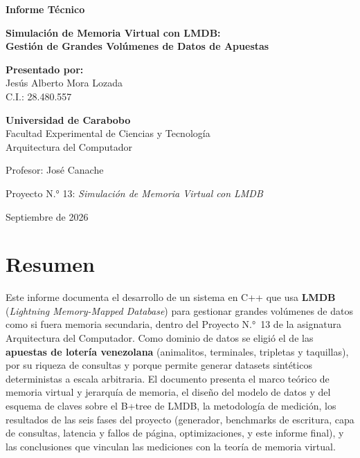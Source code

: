 \documentclass[12pt, letterpaper]{article}
\newcommand{\authorname}{Jesús Alberto Mora Lozada}
\newcommand{\institucion}{Universidad de Carabobo}
\newcommand{\profesorname}{José Canache}
\begin{document}
\begin{titlepage}
    \centering
    \vspace*{1cm}

    \Huge
    \textbf{Informe Técnico}

    \vspace{0.5cm}
    \Large
    \textbf{Simulación de Memoria Virtual con LMDB:\\
    Gestión de Grandes Volúmenes de Datos de Apuestas}

    \vspace{1.5cm}
    \normalsize
    \textbf{Presentado por:} \\
    \vspace{0.3cm}
    \authorname \\
    C.I.: 28.480.557

    \vspace{1.5cm}
    \textbf{\institucion} \\
    Facultad Experimental de Ciencias y Tecnología \\
    Arquitectura del Computador

    \vspace{0.6cm}
    Profesor: \profesorname

    \vspace{1.5cm}
    Proyecto N.° 13: \emph{Simulación de Memoria Virtual con LMDB}

    \vfill
    Septiembre de 2026
\end{titlepage}

\tableofcontents
\newpage

\section*{Resumen}

Este informe documenta el desarrollo de un sistema en C++ que usa
\textbf{LMDB} (\emph{Lightning Memory-Mapped Database}) para gestionar grandes
volúmenes de datos como si fuera memoria secundaria, dentro del Proyecto
N.°~13 de la asignatura Arquitectura del Computador. Como dominio de datos se
eligió el de las \textbf{apuestas de lotería venezolana} (animalitos,
terminales, tripletas y taquillas), por su riqueza de consultas y porque
permite generar datasets sintéticos deterministas a escala arbitraria.
El documento presenta el marco teórico de memoria virtual y jerarquía de
memoria, el diseño del modelo de datos y del esquema de claves sobre el
B+tree de LMDB, la metodología de medición, los resultados de las seis
fases del proyecto (generador, benchmarks de escritura, capa de consultas,
latencia y fallos de página, optimizaciones, y este informe final), y las
conclusiones que vinculan las mediciones con la teoría de memoria virtual.
\end{document}
